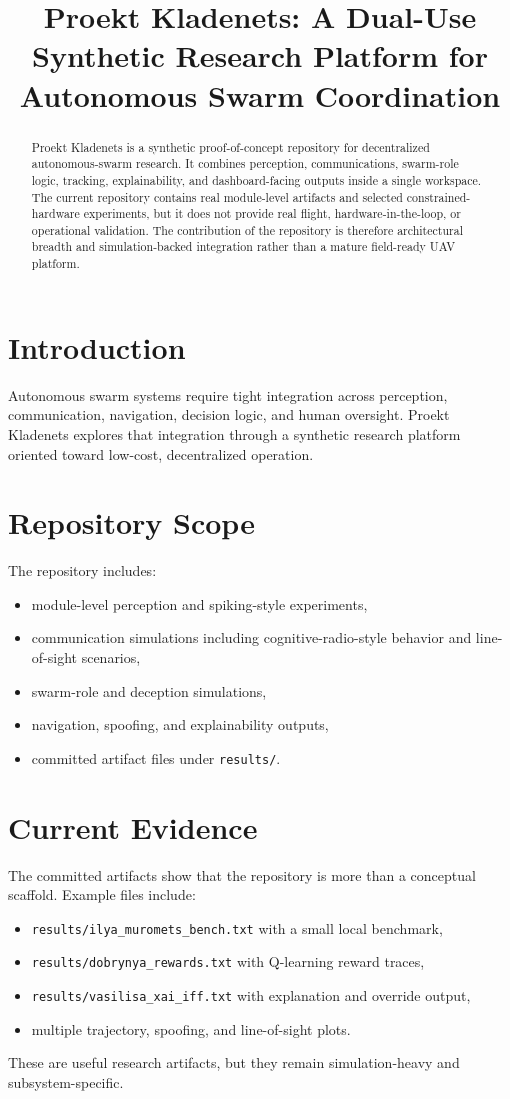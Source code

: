 \documentclass[conference]{IEEEtran}
\title{Proekt Kladenets: A Dual-Use Synthetic Research Platform for Autonomous Swarm Coordination}
\author{\IEEEauthorblockN{George David Tsitlauri}
\IEEEauthorblockA{\textit{Dept. of Informatics \& Telecommunications}\\
\textit{University of Thessaly, Greece}\\
 gdtsitlauri@gmail.com}}
\begin{document}
\maketitle

\begin{abstract}
Proekt Kladenets is a synthetic proof-of-concept repository for decentralized autonomous-swarm research. It combines perception, communications, swarm-role logic, tracking, explainability, and dashboard-facing outputs inside a single workspace. The current repository contains real module-level artifacts and selected constrained-hardware experiments, but it does not provide real flight, hardware-in-the-loop, or operational validation. The contribution of the repository is therefore architectural breadth and simulation-backed integration rather than a mature field-ready UAV platform.
\end{abstract}

\section{Introduction}
Autonomous swarm systems require tight integration across perception, communication, navigation, decision logic, and human oversight. Proekt Kladenets explores that integration through a synthetic research platform oriented toward low-cost, decentralized operation.

\section{Repository Scope}
The repository includes:
\begin{itemize}
\item module-level perception and spiking-style experiments,
\item communication simulations including cognitive-radio-style behavior and line-of-sight scenarios,
\item swarm-role and deception simulations,
\item navigation, spoofing, and explainability outputs,
\item committed artifact files under \texttt{results/}.
\end{itemize}

\section{Current Evidence}
The committed artifacts show that the repository is more than a conceptual scaffold. Example files include:
\begin{itemize}
\item \texttt{results/ilya\_muromets\_bench.txt} with a small local benchmark,
\item \texttt{results/dobrynya\_rewards.txt} with Q-learning reward traces,
\item \texttt{results/vasilisa\_xai\_iff.txt} with explanation and override output,
\item multiple trajectory, spoofing, and line-of-sight plots.
\end{itemize}
These are useful research artifacts, but they remain simulation-heavy and subsystem-specific.
\end{document}
